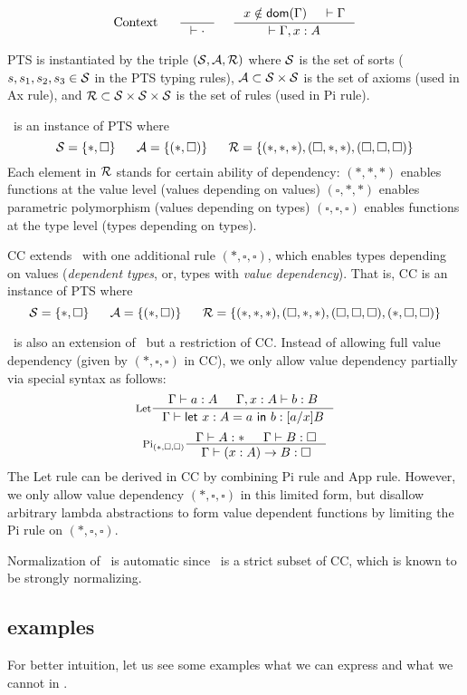 \[\text{Context}~~~~~
 \inference{}{|-\cdot}
 ~~~~
 \inference{x\notin\dom(\Gamma) & |-\Gamma}{|-\Gamma,x:A}
\]

PTS is instantiated by the triple $(\mathcal{S},\mathcal{A},\mathcal{R})$ where
$\mathcal{S}$ is the set of sorts ($s,s_1,s_2,s_3\in\mathcal{S}$ in the PTS typing rules),
$\mathcal{A}\subset\mathcal{S}\times\mathcal{S}$ is the set of axioms (used in Ax rule), and
$\mathcal{R}\subset\mathcal{S}\times\mathcal{S}\times\mathcal{S}$ is the set of rules (used in Pi rule).

\Fw\ is an instance of PTS where
\[\mathcal{S}=\{*,\square\}
  ~~~~~
  \mathcal{A}=\{(*,\square)\}
  ~~~~~
  \mathcal{R}=\{(*,*,*),(\square,*,*),(\square,\square,\square)\}
\]
Each element in $\mathcal{R}$ stands for certain ability of dependency:
$(*,*,*)$ enables functions at the value level
(values depending on values)
$(\square,*,*)$ enables parametric polymorphism
(values depending on types)
$(\square,\square,\square)$ enables functions at the type level
(types depending on types).

CC extends \Fw\ with one additional rule
$(*,\square,\square)$, which enables types depending on values
(\emph{dependent types}, or, types with \emph{value dependency}).
That is, CC is an instance of PTS where
\[\mathcal{S}=\{*,\square\}
  ~~~~~
  \mathcal{A}=\{(*,\square)\}
  ~~~~~
  \mathcal{R}=\{(*,*,*),(\square,*,*),(\square,\square,\square)
         ,(*,\square,\square)\}\]

\Fi\ is also an extension of \Fw\, but a restriction of CC.  Instead of
allowing full value dependency (given by $(*,\square,\square)$ in CC),
we only allow value dependency partially via special syntax as follows:
\[
 \inference[Let]{\Gamma |- a:A & \Gamma, x:A |- b:B}
                {\Gamma |- \mathsf{let}~x:A=a~\mathsf{in}~b : [a/x]B}
\]
\[
 \inference[Pi$_{(*,\square,\square)}$]
     {\Gamma |- A:* & \Gamma |- B:\square}
     {\Gamma |- (x:A)-> B : \square}
\]
The Let rule can be derived in CC by combining Pi rule and App rule.  However,
we only allow value dependency $(*,\square,\square)$ in this limited form,
but disallow arbitrary lambda abstractions to form value dependent functions
by limiting the Pi rule on $(*,\square,\square)$.

Normalization of \Fi\ is automatic since \Fi\ is a strict subset of CC,
which is known to be strongly normalizing.

\subsection{examples}
For better intuition, let us see some examples what we can express and
what we cannot in \Fi.
\newcommand{\List}{\mathsf{List}}
\newcommand{\Vect}{\mathsf{Vec}}


